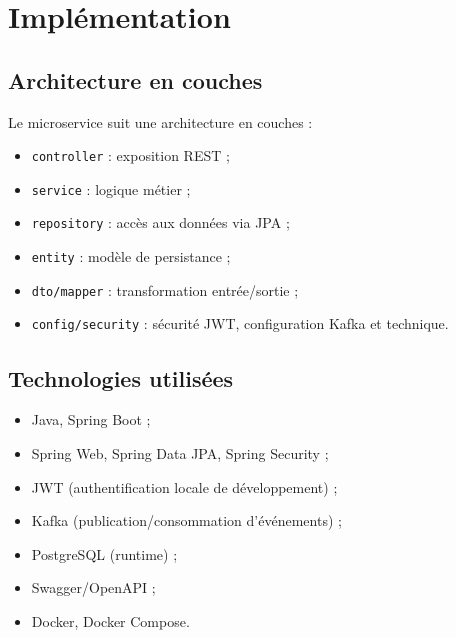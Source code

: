 \documentclass[12pt,a4paper]{report}
\begin{document}
\chapter{Implémentation}

\section{Architecture en couches}
Le microservice suit une architecture en couches :
\begin{itemize}
    \item \texttt{controller} : exposition REST ;
    \item \texttt{service} : logique métier ;
    \item \texttt{repository} : accès aux données via JPA ;
    \item \texttt{entity} : modèle de persistance ;
    \item \texttt{dto/mapper} : transformation entrée/sortie ;
    \item \texttt{config/security} : sécurité JWT, configuration Kafka et technique.
\end{itemize}

\section{Technologies utilisées}
\begin{itemize}
    \item Java, Spring Boot ;
    \item Spring Web, Spring Data JPA, Spring Security ;
    \item JWT (authentification locale de développement) ;
    \item Kafka (publication/consommation d'événements) ;
    \item PostgreSQL (runtime) ;
    \item Swagger/OpenAPI ;
    \item Docker, Docker Compose.
\end{itemize}
\end{document}
